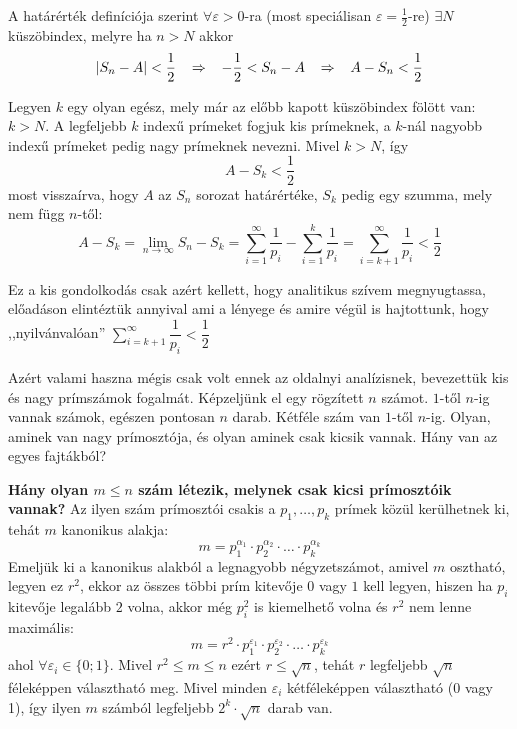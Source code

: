 \documentclass[12pt]{book}
\theoremstyle{plain} %
\theoremstyle{definition} %
\theoremstyle{remark}
\numberwithin{equation}{section}  %
\begin{document}
	A határérték definíciója szerint $\forall \varepsilon>0$-ra (most speciálisan $\varepsilon = \frac{1}{2}$-re) $\exists N$ küszöbindex, melyre ha $n>N$ akkor
	\[  |S_n-A|<\dfrac{1}{2} \hspace{3mm} \Rightarrow \hspace{3mm} -\dfrac{1}{2} < S_n - A  \hspace{3mm} \Rightarrow \hspace{3mm} A - S_n < \dfrac{1}{2}  \]
	
	Legyen $k$ egy olyan egész, mely már az előbb kapott küszöbindex fölött van: $k>N$. A legfeljebb $k$ indexű prímeket fogjuk kis prímeknek, a $k$-nál nagyobb indexű prímeket pedig nagy prímeknek nevezni. Mivel $k>N$, így 
	\[  A - S_k <\dfrac{1}{2} \]
	most visszaírva, hogy $A$ az $S_n$ sorozat határértéke, $S_k$ pedig egy szumma, mely nem függ $n$-től:
	\[ A - S_k = \lim\limits_{n\to \infty} S_n - S_k = \sum\limits_{i=1}^{\infty} \dfrac{1}{p_i} - \sum\limits_{i=1}^{k} \dfrac{1}{p_i} = \sum\limits_{i=k+1}^{\infty} \dfrac{1}{p_i} < \dfrac{1}{2}
	\]
	
	Ez a kis gondolkodás csak azért kellett, hogy analitikus szívem megnyugtassa, előadáson elintéztük annyival ami a lényege és amire végül is hajtottunk, hogy ,,nyilvánvalóan'' $\displaystyle \sum\limits_{i=k+1}^{\infty} \dfrac{1}{p_i} < \dfrac{1}{2}$
	
	Azért valami haszna mégis csak volt ennek az oldalnyi analízisnek, bevezettük kis és nagy prímszámok fogalmát. Képzeljünk el egy rögzített $n$ számot. $1$-től $n$-ig vannak számok, egészen pontosan $n$ darab. Kétféle szám van $1$-től $n$-ig. Olyan, aminek van nagy prímosztója, és olyan aminek csak kicsik vannak. Hány van az egyes fajtákból?
	
	\textbf{Hány olyan $m\leq n$ szám létezik, melynek csak kicsi prímosztóik vannak?} Az ilyen szám prímosztói csakis a $p_1,\ldots,p_k$ prímek közül kerülhetnek ki, tehát $m$ kanonikus alakja:
	\[ m = p_1^{\alpha_1} \cdot p_2^{\alpha_2} \cdot \ldots \cdot p_k^{\alpha_k}  \]
	Emeljük ki a kanonikus alakból a legnagyobb négyzetszámot, amivel $m$ osztható, legyen ez $r^2$, ekkor az összes többi prím kitevője $0$ vagy $1$ kell legyen, hiszen ha $p_i$ kitevője legalább $2$ volna, akkor még $p_i^2$ is kiemelhető volna és $r^2$ nem lenne maximális:
	\[ m = r^2 \cdot p_1^{\varepsilon_1} \cdot p_2^{\varepsilon_2} \cdot \ldots \cdot p_k^{\varepsilon_k}  \]
	ahol $\forall \varepsilon_i \in \{ 0; 1 \}$.
	Mivel $r^2\leq m\leq n$ ezért $r\leq \sqrt{n}$, tehát $r$ legfeljebb $\sqrt{n}$ féleképpen választható meg. Mivel minden $\varepsilon_i$ kétféleképpen választható (0 vagy 1), így ilyen $m$ számból legfeljebb $2^k\cdot \sqrt{n}$ darab van.
	
\end{document}
